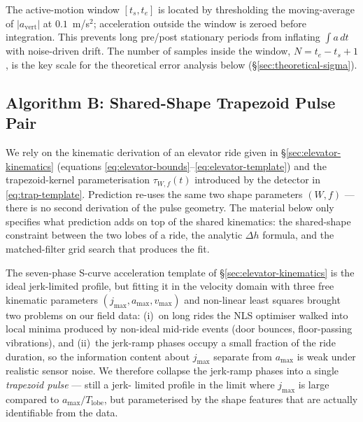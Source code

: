 The active-motion window $[t_s,t_e]$ is located by thresholding the
moving-average of $|a_\mathrm{vert}|$ at $0.1$~m/s$^2$; acceleration
outside the window is zeroed before integration. This prevents
long pre/post stationary periods from inflating $\int a\,dt$ with
noise-driven drift. The number of samples inside the window,
$N=t_e-t_s+1$, is the key scale for the theoretical error analysis
below (\S\ref{sec:theoretical-sigma}).

\subsection{Algorithm B: Shared-Shape Trapezoid Pulse Pair}
\label{sec:algo-trapezoid}

We rely on the kinematic derivation of an elevator ride given in
\S\ref{sec:elevator-kinematics} (equations
\eqref{eq:elevator-bounds}--\eqref{eq:elevator-template}) and the
trapezoid-kernel parameterisation $\tau_{W,f}(t)$ introduced by the
detector in \eqref{eq:trap-template}. Prediction re-uses the same
two shape parameters $(W,f)$ — there is no second derivation of the
pulse geometry. The material below only specifies what prediction
adds on top of the shared kinematics: the shared-shape constraint
between the two lobes of a ride, the analytic $\Delta h$ formula,
and the matched-filter grid search that produces the fit.

The seven-phase S-curve acceleration template of
\S\ref{sec:elevator-kinematics} is the ideal jerk-limited profile,
but fitting it in the velocity domain with three free kinematic
parameters $(j_{\max},a_{\max},v_{\max})$ and non-linear least squares
brought two problems on our field data: (i)~on long rides the NLS
optimiser walked into local minima produced by non-ideal mid-ride
events (door bounces, floor-passing vibrations), and (ii)~the
jerk-ramp phases occupy a small fraction of the ride duration, so
the information content about $j_{\max}$ separate from $a_{\max}$
is weak under realistic sensor noise. We therefore collapse the
jerk-ramp phases into a single \emph{trapezoid pulse} — still a jerk-
limited profile in the limit where $j_{\max}$ is large compared to
$a_{\max}/T_\mathrm{lobe}$, but parameterised by the shape features
that are actually identifiable from the data.

